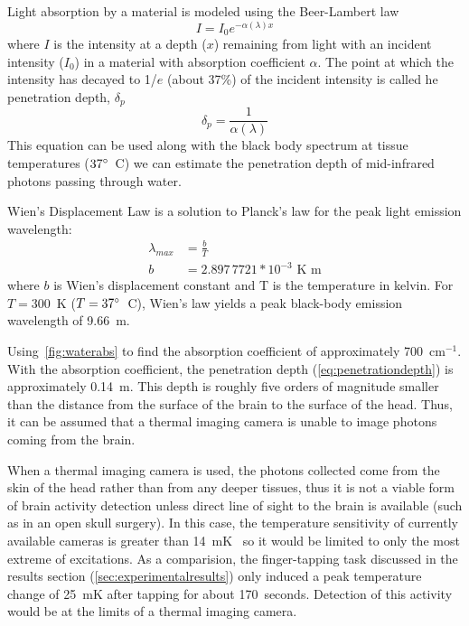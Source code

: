 Light absorption by a material is modeled using the Beer-Lambert law
\begin{equation}
  I = I_0 e^{-\alpha (\lambda) x} \label{eq:beerlambert}
\end{equation}
where $I$ is the intensity at a depth ($x$) remaining from light with an incident intensity ($I_0$) in a material with absorption coefficient $\alpha$.  The point at which the intensity has decayed to 1/$e$ (about 37\%) of the incident intensity is called he penetration depth, $\delta_{p}$
\begin{equation}
  \delta_p = \frac{1}{\alpha (\lambda)} \label{eq:penetrationdepth}
\end{equation}
This equation can be used along with the black body spectrum at tissue temperatures ($37^\circ$~C) we can estimate the penetration depth of mid-infrared photons passing through water.

Wien's Displacement Law is a solution to Planck's law for the peak light emission wavelength:
\begin{align}
  \lambda_{max} &= \frac{b}{T} \label{eq:wienslaw} \\
  b &= 2.897\,7721 * 10^{-3} \mbox{ K m} \nonumber
\end{align}
where $b$ is Wien's displacement constant and T is the temperature in kelvin.  For $T=300$~K ($T=37^\circ$~C), Wien's law yields a peak black-body emission wavelength of 9.66~\textmu m.  

Using~\cref{fig:waterabs} to find the absorption coefficient of approximately 700~cm$^{-1}$.  With the absorption coefficient, the penetration depth (\cref{eq:penetrationdepth}) is approximately 0.14~\textmu m.  This depth is roughly five orders of magnitude smaller than the distance from the surface of the brain to the surface of the head.  Thus, it can be assumed that a thermal imaging camera is unable to image photons coming from the brain.

When a thermal imaging camera is used, the photons collected come from the skin of the head rather than from any deeper tissues, thus it is not a viable form of brain activity detection unless direct line of sight to the brain is available (such as in an open skull surgery).  In this case, the temperature sensitivity of currently available cameras is greater than 14~mK~\citep{flir,ici} so it would be limited to only the most extreme of excitations.  As a comparision, the finger-tapping task discussed in the results section (\cref{sec:experimentalresults}) only induced a peak temperature change of 25~mK after tapping for about 170~seconds.  Detection of this activity would be at the limits of a thermal imaging camera.